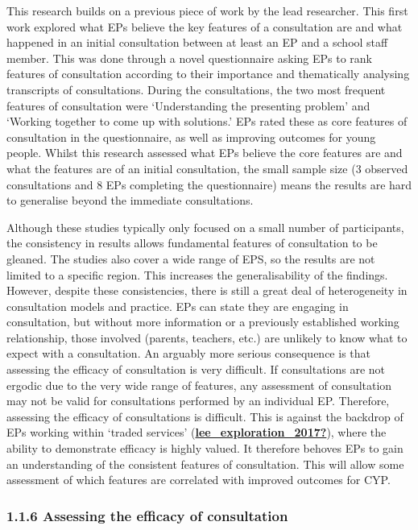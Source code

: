 \documentclass[
]{article}
\begin{document}
This research builds on a previous piece of work by the lead researcher.
This first work explored what EPs believe the key features of a
consultation are and what happened in an initial consultation between at
least an EP and a school staff member. This was done through a novel
questionnaire asking EPs to rank features of consultation according to
their importance and thematically analysing transcripts of
consultations. During the consultations, the two most frequent features
of consultation were `Understanding the presenting problem' and `Working
together to come up with solutions.' EPs rated these as core features of
consultation in the questionnaire, as well as improving outcomes for
young people. Whilst this research assessed what EPs believe the core
features are and what the features are of an initial consultation, the
small sample size (3 observed consultations and 8 EPs completing the
questionnaire) means the results are hard to generalise beyond the
immediate consultations.

Although these studies typically only focused on a small number of
participants, the consistency in results allows fundamental features of
consultation to be gleaned. The studies also cover a wide range of EPS,
so the results are not limited to a specific region. This increases the
generalisability of the findings. However, despite these consistencies,
there is still a great deal of heterogeneity in consultation models and
practice. EPs can state they are engaging in consultation, but without
more information or a previously established working relationship, those
involved (parents, teachers, etc.) are unlikely to know what to expect
with a consultation. An arguably more serious consequence is that
assessing the efficacy of consultation is very difficult. If
consultations are not ergodic due to the very wide range of features,
any assessment of consultation may not be valid for consultations
performed by an individual EP. Therefore, assessing the efficacy of
consultations is difficult. This is against the backdrop of EPs working
within `traded services'
(\protect\hyperlink{ref-lee_exploration_2017}{\textbf{lee\_exploration\_2017?}}),
where the ability to demonstrate efficacy is highly valued. It therefore
behoves EPs to gain an understanding of the consistent features of
consultation. This will allow some assessment of which features are
correlated with improved outcomes for CYP.

\hypertarget{assessing-the-efficacy-of-consultation}{%
\subsubsection{1.1.6 Assessing the efficacy of
consultation}\label{assessing-the-efficacy-of-consultation}}
\end{document}
